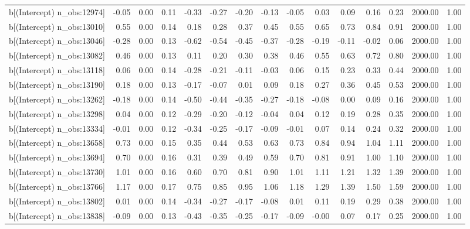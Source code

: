 \begin{table}[ht]
\begin{tabular}{rrrrrrrrrrrrrrr}
  b[(Intercept) n\_obs:12974] & -0.05 & 0.00 & 0.11 & -0.33 & -0.27 & -0.20 & -0.13 & -0.05 & 0.03 & 0.09 & 0.16 & 0.23 & 2000.00 & 1.00 \\ 
  b[(Intercept) n\_obs:13010] & 0.55 & 0.00 & 0.14 & 0.18 & 0.28 & 0.37 & 0.45 & 0.55 & 0.65 & 0.73 & 0.84 & 0.91 & 2000.00 & 1.00 \\ 
  b[(Intercept) n\_obs:13046] & -0.28 & 0.00 & 0.13 & -0.62 & -0.54 & -0.45 & -0.37 & -0.28 & -0.19 & -0.11 & -0.02 & 0.06 & 2000.00 & 1.00 \\ 
  b[(Intercept) n\_obs:13082] & 0.46 & 0.00 & 0.13 & 0.11 & 0.20 & 0.30 & 0.38 & 0.46 & 0.55 & 0.63 & 0.72 & 0.80 & 2000.00 & 1.00 \\ 
  b[(Intercept) n\_obs:13118] & 0.06 & 0.00 & 0.14 & -0.28 & -0.21 & -0.11 & -0.03 & 0.06 & 0.15 & 0.23 & 0.33 & 0.44 & 2000.00 & 1.00 \\ 
  b[(Intercept) n\_obs:13190] & 0.18 & 0.00 & 0.13 & -0.17 & -0.07 & 0.01 & 0.09 & 0.18 & 0.27 & 0.36 & 0.45 & 0.53 & 2000.00 & 1.00 \\ 
  b[(Intercept) n\_obs:13262] & -0.18 & 0.00 & 0.14 & -0.50 & -0.44 & -0.35 & -0.27 & -0.18 & -0.08 & 0.00 & 0.09 & 0.16 & 2000.00 & 1.00 \\ 
  b[(Intercept) n\_obs:13298] & 0.04 & 0.00 & 0.12 & -0.29 & -0.20 & -0.12 & -0.04 & 0.04 & 0.12 & 0.19 & 0.28 & 0.35 & 2000.00 & 1.00 \\ 
  b[(Intercept) n\_obs:13334] & -0.01 & 0.00 & 0.12 & -0.34 & -0.25 & -0.17 & -0.09 & -0.01 & 0.07 & 0.14 & 0.24 & 0.32 & 2000.00 & 1.00 \\ 
  b[(Intercept) n\_obs:13658] & 0.73 & 0.00 & 0.15 & 0.35 & 0.44 & 0.53 & 0.63 & 0.73 & 0.84 & 0.94 & 1.04 & 1.11 & 2000.00 & 1.00 \\ 
  b[(Intercept) n\_obs:13694] & 0.70 & 0.00 & 0.16 & 0.31 & 0.39 & 0.49 & 0.59 & 0.70 & 0.81 & 0.91 & 1.00 & 1.10 & 2000.00 & 1.00 \\ 
  b[(Intercept) n\_obs:13730] & 1.01 & 0.00 & 0.16 & 0.60 & 0.70 & 0.81 & 0.90 & 1.01 & 1.11 & 1.21 & 1.32 & 1.39 & 2000.00 & 1.00 \\ 
  b[(Intercept) n\_obs:13766] & 1.17 & 0.00 & 0.17 & 0.75 & 0.85 & 0.95 & 1.06 & 1.18 & 1.29 & 1.39 & 1.50 & 1.59 & 2000.00 & 1.00 \\ 
  b[(Intercept) n\_obs:13802] & 0.01 & 0.00 & 0.14 & -0.34 & -0.27 & -0.17 & -0.08 & 0.01 & 0.11 & 0.19 & 0.29 & 0.38 & 2000.00 & 1.00 \\ 
  b[(Intercept) n\_obs:13838] & -0.09 & 0.00 & 0.13 & -0.43 & -0.35 & -0.25 & -0.17 & -0.09 & -0.00 & 0.07 & 0.17 & 0.25 & 2000.00 & 1.00 \\ 

\end{tabular}
\end{table}
